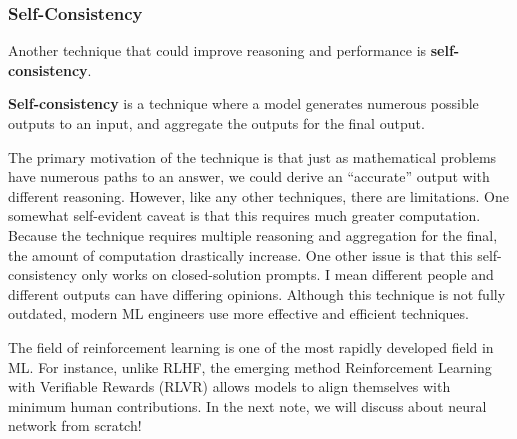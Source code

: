 \documentclass[../main.tex]{subfiles}
\begin{document}
\subsubsection{Self-Consistency}

Another technique that could improve reasoning and performance
is \textbf{self-consistency}.

\begin{definition}{}{}
\textbf{Self-consistency} is a technique where a model generates
numerous possible outputs to an input, and aggregate the outputs
for the final output.
\end{definition}

The primary motivation of the technique is that just as mathematical
problems have numerous paths to an answer, we could derive an
``accurate'' output with different reasoning. However, like any
other techniques, there are limitations. One somewhat self-evident
caveat is that this requires much greater computation. Because the
technique requires multiple reasoning and aggregation for the final,
the amount of computation drastically increase. One other issue is
that this self-consistency only works on closed-solution prompts.
I mean different people and different outputs can have differing
opinions. Although this technique is not fully outdated, modern ML
engineers use more effective and efficient techniques.

The field of reinforcement learning is one of the most rapidly
developed field in ML. For instance, unlike RLHF, the emerging
method Reinforcement Learning with Verifiable Rewards (RLVR)
allows models to align themselves with minimum human contributions.
In the next note, we will discuss about neural network from scratch!
\end{document}

